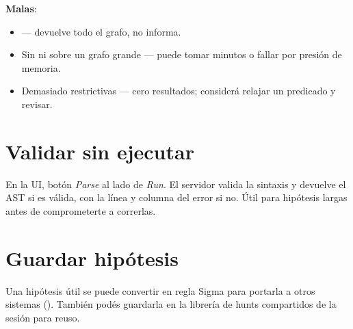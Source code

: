 \textbf{Malas}:

\begin{itemize}
    \item \code{* -[*]-> *} — devuelve todo el grafo, no informa.
    \item Sin  ni  sobre un grafo grande —
    puede tomar minutos o fallar por presión de memoria.
    \item Demasiado restrictivas — cero resultados; considerá
    relajar un predicado y revisar.
\end{itemize}

\section{Validar sin ejecutar}

En la UI, botón \emph{Parse} al lado de \emph{Run}. El servidor
valida la sintaxis y devuelve el AST si es válida, con la línea y
columna del error si no. Útil para hipótesis largas antes de
comprometerte a correrlas.

\section{Guardar hipótesis}

Una hipótesis útil se puede convertir en regla Sigma para
portarla a otros sistemas (). También podés guardarla en la librería de hunts compartidos
de la sesión para reuso.
